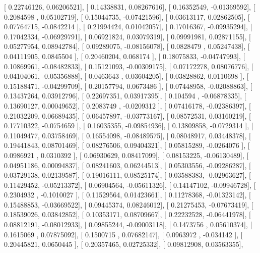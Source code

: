\documentclass{article}
\begin{document}
       [ 0.22746126,  0.06206521],
       [ 0.14338831,  0.08267616],
       [ 0.16352549, -0.01369592],
       [ 0.2084598 ,  0.05102719],
       [ 0.15044735, -0.07421596],
       [ 0.03613117,  0.02862505],
       [ 0.07764715, -0.0842214 ],
       [ 0.21994424,  0.01042057],
       [ 0.17016367, -0.09935294],
       [ 0.17042334, -0.06929791],
       [ 0.06921824,  0.03079319],
       [ 0.09991981,  0.02871155],
       [ 0.05277954,  0.08942784],
       [ 0.09289075, -0.08156078],
       [ 0.0828479 ,  0.05247438],
       [ 0.04111905,  0.0845504 ],
       [ 0.20460204,  0.068174  ],
       [ 0.18075833, -0.04747993],
       [ 0.10869961, -0.08482833],
       [ 0.15121093, -0.00309175],
       [ 0.07172278,  0.08076776],
       [ 0.04104061, -0.05356888],
       [ 0.0463643 ,  0.03604205],
       [ 0.03828862,  0.0110698 ],
       [ 0.15188471, -0.04299709],
       [ 0.20157794,  0.0673486 ],
       [ 0.07448958, -0.02088863],
       [ 0.13437264,  0.03912796],
       [ 0.22697351,  0.03917395],
       [ 0.104594  , -0.06878335],
       [ 0.13690127,  0.00049652],
       [ 0.2083749 , -0.0209312 ],
       [ 0.07416178, -0.02386397],
       [ 0.21032209,  0.06689435],
       [ 0.06457897, -0.03773167],
       [ 0.08572531,  0.03160219],
       [ 0.17710322, -0.0754659 ],
       [ 0.16035355, -0.09854936],
       [ 0.13809858, -0.0729314 ],
       [ 0.11049477,  0.03758469],
       [ 0.16554098, -0.08489575],
       [ 0.08048917,  0.03448378],
       [ 0.19441843,  0.08701469],
       [ 0.08276506,  0.09404321],
       [ 0.05815289, -0.0264076 ],
       [ 0.0986921 ,  0.0310392 ],
       [ 0.06930629,  0.08417099],
       [ 0.08153225, -0.06130489],
       [ 0.04951186,  0.00094837],
       [ 0.08241603,  0.06244513],
       [ 0.05303556, -0.09286287],
       [ 0.03729138,  0.02139587],
       [ 0.19016111,  0.08525174],
       [ 0.03588383, -0.02963627],
       [ 0.11429452, -0.05213372],
       [ 0.06904564, -0.05611326],
       [ 0.14147102, -0.09946728],
       [ 0.2304932 , -0.1010027 ],
       [ 0.11529564,  0.01423661],
       [ 0.11278368, -0.01323142],
       [ 0.15488853, -0.03669522],
       [ 0.09445374,  0.08246012],
       [ 0.21275453, -0.07673419],
       [ 0.18539026,  0.03842852],
       [ 0.10353171,  0.08709667],
       [ 0.22232528, -0.06441978],
       [ 0.08812191, -0.08012933],
       [ 0.09855244, -0.09003118],
       [ 0.1473756 ,  0.05610374],
       [ 0.1615069 ,  0.07875092],
       [ 0.1500715 ,  0.07682147],
       [ 0.0963972 , -0.034142  ],
       [ 0.20445821,  0.0650445 ],
       [ 0.20357465,  0.02725332],
       [ 0.09812908,  0.03563355],
\end{document}
